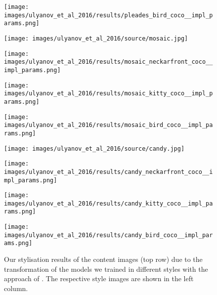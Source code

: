 \begin{figure}[H]
\begin{minipage}[t]{0.24\textwidth}
	\end{minipage}
	\hfill%
	\begin{minipage}[t]{0.24\textwidth}
		\centering
		\texttt{[image: images/ulyanov\_et\_al\_2016/results/pleades\_bird\_coco\_\_impl\_params.png]}
	\end{minipage}
	\hfill%
	\begin{minipage}[t]{0.24\textwidth}
		\centering
		\texttt{[image: images/ulyanov\_et\_al\_2016/source/mosaic.jpg]}
	\end{minipage}
	\hfill%
	\begin{minipage}[t]{0.24\textwidth}
		\centering
		\texttt{[image: images/ulyanov\_et\_al\_2016/results/mosaic\_neckarfront\_coco\_\_impl\_params.png]}
	\end{minipage}
	\hfill%
	\begin{minipage}[t]{0.24\textwidth}
		\centering
		\texttt{[image: images/ulyanov\_et\_al\_2016/results/mosaic\_kitty\_coco\_\_impl\_params.png]}
	\end{minipage}
	\hfill%
	\begin{minipage}[t]{0.24\textwidth}
		\centering
		\texttt{[image: images/ulyanov\_et\_al\_2016/results/mosaic\_bird\_coco\_\_impl\_params.png]}
	\end{minipage}
	\hfill%
	\begin{minipage}[t]{0.24\textwidth}
		\centering
		\texttt{[image: images/ulyanov\_et\_al\_2016/source/candy.jpg]}
	\end{minipage}
	\hfill%
	\begin{minipage}[t]{0.24\textwidth}
		\centering
		\texttt{[image: images/ulyanov\_et\_al\_2016/results/candy\_neckarfront\_coco\_\_impl\_params.png]}
	\end{minipage}
	\hfill%
	\begin{minipage}[t]{0.24\textwidth}
		\centering
		\texttt{[image: images/ulyanov\_et\_al\_2016/results/candy\_kitty\_coco\_\_impl\_params.png]}
	\end{minipage}
	\hfill%
	\begin{minipage}[t]{0.24\textwidth}
		\centering
		\texttt{[image: images/ulyanov\_et\_al\_2016/results/candy\_bird\_coco\_\_impl\_params.png]}
	\end{minipage}
	\caption{Our stylisation results of the content images (top row) due to the transformation of the models we trained in different styles with the approach of \cite{ULVL2016}. The respective style images are shown in the left column.}
	\label{fig:ulyanov_et_al_2016_impl}
\end{figure}


